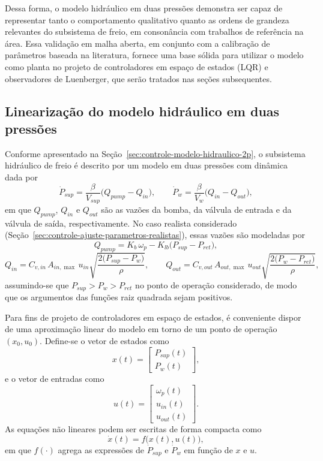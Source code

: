 Dessa forma, o modelo hidráulico em duas pressões demonstra ser capaz de representar tanto o comportamento qualitativo quanto as ordens de grandeza relevantes do subsistema de freio, em consonância com trabalhos de referência na área. Essa validação em malha aberta, em conjunto com a calibração de parâmetros baseada na literatura, fornece uma base sólida para utilizar o modelo como planta no projeto de controladores em espaço de estados (LQR) e observadores de Luenberger, que serão tratados nas seções subsequentes.


\subsection{Linearização do modelo hidráulico em duas pressões}
\label{sec:controle-linearizacao-2p}

Conforme apresentado na Seção~\ref{sec:controle-modelo-hidraulico-2p}, o subsistema hidráulico de freio é descrito por um modelo em duas pressões com dinâmica dada por
\[
    \dot{P}_{sup} = \frac{\beta}{V_{sup}}\big(Q_{pump} - Q_{in}\big), 
    \qquad
    \dot{P}_{w}   = \frac{\beta}{V_{w}}\big(Q_{in} - Q_{out}\big),
\]
em que $Q_{pump}$, $Q_{in}$ e $Q_{out}$ são as vazões da bomba, da válvula de entrada e da válvula de saída, respectivamente. No caso realista considerado (Seção~\ref{sec:controle-ajuste-parametros-realistas}), essas vazões são modeladas por
\[
    Q_{pump} = K_b\,\omega_p - K_{lb}\big(P_{sup} - P_{ret}\big),
\]
\[
    Q_{in} = C_{v,in}\,A_{in,\max}\,u_{in}
             \sqrt{\frac{2\big(P_{sup} - P_{w}\big)}{\rho}},
    \qquad
    Q_{out} = C_{v,out}\,A_{out,\max}\,u_{out}
             \sqrt{\frac{2\big(P_{w} - P_{ret}\big)}{\rho}},
\]
assumindo-se que $P_{sup} > P_{w} > P_{ret}$ no ponto de operação considerado, de modo que os argumentos das funções raiz quadrada sejam positivos.

Para fins de projeto de controladores em espaço de estados, é conveniente dispor de uma aproximação linear do modelo em torno de um ponto de operação $(x_0,u_0)$. Define-se o vetor de estados como
\[
    x(t) = 
    \begin{bmatrix}
        P_{sup}(t) \\
        P_{w}(t)
    \end{bmatrix},
\]
e o vetor de entradas como
\[
    u(t) = 
    \begin{bmatrix}
        \omega_p(t) \\
        u_{in}(t) \\
        u_{out}(t)
    \end{bmatrix}.
\]
As equações não lineares podem ser escritas de forma compacta como
\[
    \dot{x}(t) = f\big(x(t),u(t)\big),
\]
em que $f(\cdot)$ agrega as expressões de $\dot{P}_{sup}$ e $\dot{P}_{w}$ em função de $x$ e $u$.

